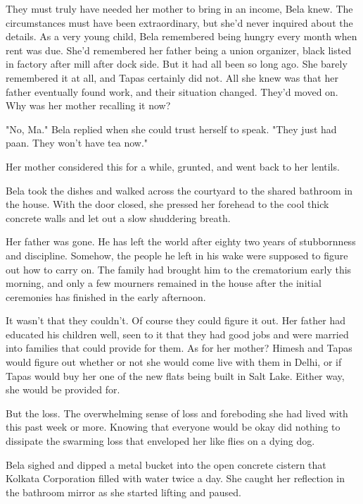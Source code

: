 \documentclass{amsart}
\begin{document}
They must truly have needed her mother to bring in an income, Bela knew. The circumstances must have been extraordinary, but she'd never inquired about the details. As a very young child, Bela remembered being hungry every month when rent was due. She'd remembered her father being a union organizer, black listed in factory after mill after dock side. But it had all been so long ago. She barely remembered it at all, and Tapas certainly did not. All she knew was that her father eventually found work, and their situation changed. They'd moved on. Why was her mother recalling it now?

"No, Ma." Bela replied when she could trust herself to speak. "They just had paan. They won't have tea now."

Her mother considered this for a while, grunted, and went back to her lentils.

Bela took the dishes and walked across the courtyard to the shared bathroom in the house. With the door closed, she pressed her forehead to the cool thick concrete walls and let out a slow shuddering breath.

Her father was gone. He has left the world after eighty two years of stubbornness and discipline. Somehow, the people he left in his wake were supposed to figure out how to carry on. The family had brought him to the crematorium early this morning, and only a few mourners remained in the house after the initial ceremonies has finished in the early afternoon.

It wasn't that they couldn't. Of course they could figure it out. Her father had educated his children well, seen to it that they had good jobs and were married into families that could provide for them. As for her mother? Himesh and Tapas would figure out whether or not she would come live with them in Delhi, or if Tapas would buy her one of the new flats being built in Salt Lake. Either way, she would be provided for. 

But the loss. The overwhelming sense of loss and foreboding she had lived with this past week or more. Knowing that everyone would be okay did nothing to dissipate the swarming loss that enveloped her like flies on a dying dog.

Bela sighed and dipped a metal bucket into the open concrete cistern that Kolkata Corporation filled with water twice a day. She caught her reflection in the bathroom mirror as she started lifting and paused.
\end{document}
